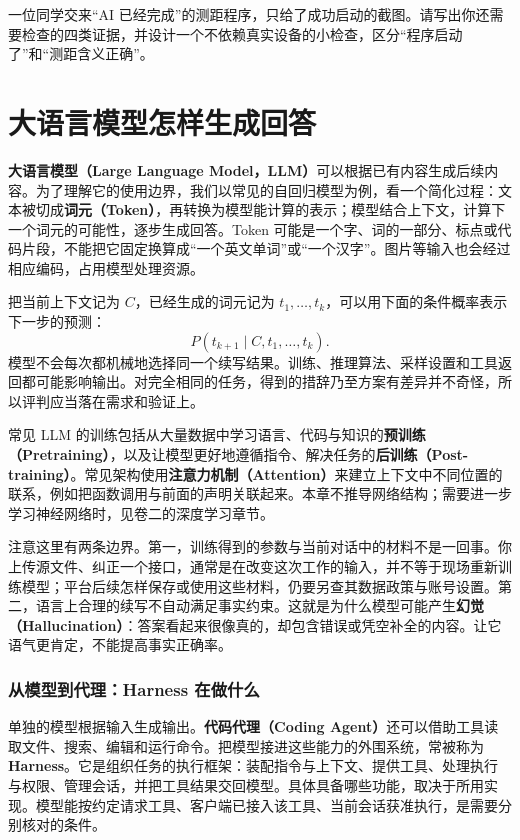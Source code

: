 \begin{exercise}\label{ex:ai-principle-responsibility}
一位同学交来“AI 已经完成”的测距程序，只给了成功启动的截图。请写出你还需要检查的四类证据，并设计一个不依赖真实设备的小检查，区分“程序启动了”和“测距含义正确”。
\end{exercise}

\section{大语言模型怎样生成回答}
\label{sec:ai-llm}

\textbf{大语言模型（Large Language Model，LLM）}可以根据已有内容生成后续内容。为了理解它的使用边界，我们以常见的自回归模型为例，看一个简化过程：文本被切成\textbf{词元（Token）}，再转换为模型能计算的表示；模型结合上下文，计算下一个词元的可能性，逐步生成回答。Token 可能是一个字、词的一部分、标点或代码片段，不能把它固定换算成“一个英文单词”或“一个汉字”。图片等输入也会经过相应编码，占用模型处理资源。

把当前上下文记为 $C$，已经生成的词元记为 $t_1,\ldots,t_k$，可以用下面的条件概率表示下一步的预测：
\[
    P(t_{k+1}\mid C,t_1,\ldots,t_k).
\]
模型不会每次都机械地选择同一个续写结果。训练、推理算法、采样设置和工具返回都可能影响输出。对完全相同的任务，得到的措辞乃至方案有差异并不奇怪，所以评判应当落在需求和验证上。

常见 LLM 的训练包括从大量数据中学习语言、代码与知识的\textbf{预训练（Pretraining）}，以及让模型更好地遵循指令、解决任务的\textbf{后训练（Post-training）}。常见架构使用\textbf{注意力机制（Attention）}来建立上下文中不同位置的联系，例如把函数调用与前面的声明关联起来。本章不推导网络结构；需要进一步学习神经网络时，见卷二的深度学习章节。

注意这里有两条边界。第一，训练得到的参数与当前对话中的材料不是一回事。你上传源文件、纠正一个接口，通常是在改变这次工作的输入，并不等于现场重新训练模型；平台后续怎样保存或使用这些材料，仍要另查其数据政策与账号设置。第二，语言上合理的续写不自动满足事实约束。这就是为什么模型可能产生\textbf{幻觉（Hallucination）}：答案看起来很像真的，却包含错误或凭空补全的内容。让它语气更肯定，不能提高事实正确率。

\subsubsection{从模型到代理：Harness 在做什么}

单独的模型根据输入生成输出。\textbf{代码代理（Coding Agent）}还可以借助工具读取文件、搜索、编辑和运行命令。把模型接进这些能力的外围系统，常被称为 \textbf{Harness}。它是组织任务的执行框架：装配指令与上下文、提供工具、处理执行与权限、管理会话，并把工具结果交回模型。具体具备哪些功能，取决于所用实现。模型能按约定请求工具、客户端已接入该工具、当前会话获准执行，是需要分别核对的条件。

